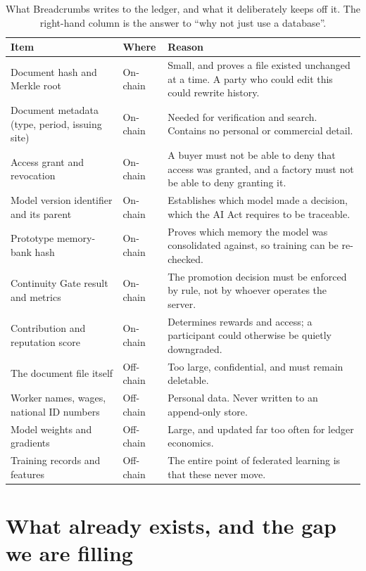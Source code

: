 \documentclass[11pt,a4paper]{article}
\begin{document}
\begin{table}[htbp]
\centering
\caption{What Breadcrumbs writes to the ledger, and what it deliberately keeps
off it. The right-hand column is the answer to ``why not just use a database''.}
\label{tab:onchain}
\small
\begin{tabularx}{\textwidth}{@{}l l Y@{}}
\toprule
\textbf{Item} & \textbf{Where} & \textbf{Reason} \\
\midrule
Document hash and Merkle root & On-chain & Small, and proves a file existed
unchanged at a time. A party who could edit this could rewrite history. \\
Document metadata (type, period, issuing site) & On-chain & Needed for
verification and search. Contains no personal or commercial detail. \\
Access grant and revocation & On-chain & A buyer must not be able to deny that
access was granted, and a factory must not be able to deny granting it. \\
Model version identifier and its parent & On-chain & Establishes which model
made a decision, which the AI Act requires to be traceable. \\
Prototype memory-bank hash & On-chain & Proves which memory the
model was consolidated against, so training can be re-checked. \\
Continuity Gate result and metrics & On-chain & The promotion decision must be
enforced by rule, not by whoever operates the server. \\
Contribution and reputation score & On-chain & Determines rewards and access;
a participant could otherwise be quietly downgraded. \\
\midrule
The document file itself & Off-chain & Too large, confidential, and must remain
deletable. \\
Worker names, wages, national ID numbers & Off-chain & Personal data. Never
written to an append-only store. \\
Model weights and gradients & Off-chain & Large, and updated far too often for
ledger economics. \\
Training records and features & Off-chain & The entire point of federated
learning is that these never move. \\
\bottomrule
\end{tabularx}
\end{table}

\section{What already exists, and the gap we are filling}
\label{sec:priorart}
\end{document}
